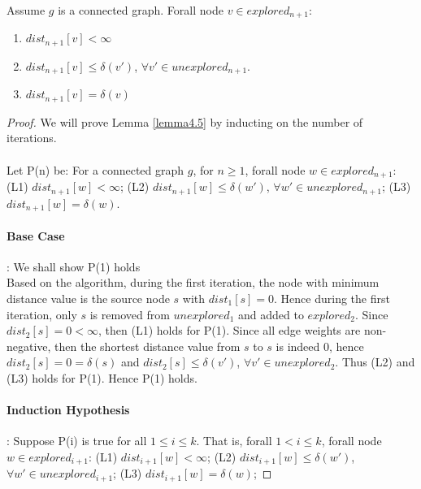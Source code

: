 \begin{sublemma}\label{lemma4.5}
Assume $g$ is a connected graph. Forall node $v \in explored_{n+1}$:
\begin{enumerate}
  \item $dist_{n+1}[v] < \infty$
  \item $dist_{n+1}[v]  \leq \delta(v')$, $\forall v' \in unexplored_{n+1}$.
  \item $dist_{n+1}[v] = \delta(v)$
\end{enumerate}
\end{sublemma}

\begin{proof}
We will prove Lemma \ref{lemma4.5} by inducting on the number of iterations. 
\\\\
Let P(n) be: For a connected graph $g$, for $n \geq 1$, forall node $w \in explored_{n+1}$: (L1) $dist_{n+1}[w] < \infty$; (L2) $dist_{n+1}[w] \leq \delta(w')$, $\forall w' \in unexplored_{n+1}$; (L3) $dist_{n+1}[w] = \delta(w)$. 

\paragraph*{Base Case}: We shall show P(1) holds \\
Based on the algorithm, during the first iteration, the node with minimum distance value is the source node $s$ with $dist_1[s] = 0$. Hence during the first iteration, only $s$ is removed from $unexplored_1$ and added to $explored_2$. Since $dist_2[s] = 0 < \infty$, then (L1) holds for P(1). Since all edge weights are non-negative, then the shortest distance value from $s$ to $s$ is indeed $0$, hence $dist_2[s] = 0 = \delta(s)$ and $dist_2[s] \leq \delta(v')$, $\forall v' \in unexplored_2$. Thus (L2) and (L3) holds for P(1). Hence P(1) holds.

\paragraph*{Induction Hypothesis}: Suppose P(i) is true for all $1 \leq i \leq k$. That is, forall $1 < i \leq k$, forall node $w \in explored_{i+1}$: (L1) $dist_{i+1}[w] < \infty$; (L2) $dist_{i+1}[w] \leq \delta(w')$, $\forall w' \in unexplored_{i+1}$; (L3) $dist_{i+1}[w] = \delta(w)$; 


\end{proof}
